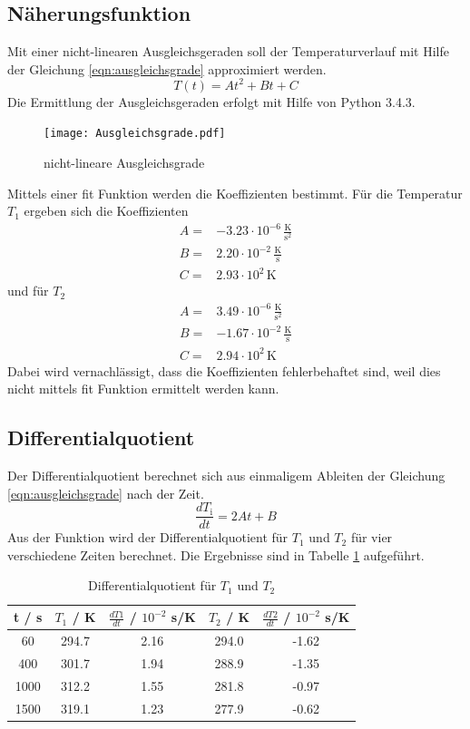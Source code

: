 \subsection{Näherungsfunktion}
Mit einer nicht-linearen Ausgleichsgeraden soll der Temperaturverlauf mit Hilfe der Gleichung \ref{eqn:ausgleichsgrade} approximiert werden.
\begin{equation}
  T(t) = At^2 + Bt +C
  \label{eqn:ausgleichsgrade}
\end{equation}
Die Ermittlung der Ausgleichsgeraden erfolgt mit Hilfe von Python 3.4.3.
\begin{figure}
  \centering
  \texttt{[image: Ausgleichsgrade.pdf]}
  \caption{nicht-lineare Ausgleichsgrade}
  \label{fig:ausg}
\end{figure}
Mittels einer fit Funktion werden die Koeffizienten bestimmt. Für die Temperatur $T_\text{1}$ ergeben sich die Koeffizienten
\begin{eqnarray*}
  A =& -3.23 \cdot 10^{-6} \, \frac{\text{K}}{\text{s}^2}	\\
  B =& 2.20 \cdot 10^{-2} \, \frac{\text{K}}{\text{s}} 	\\
  C =& 2.93 \cdot 10^{2} \, \text{K} 
  \label{eqn:koefT1}
\end{eqnarray*}
und für $T_\text{2}$
\begin{eqnarray*}
  A =& 3.49 \cdot 10^{-6} \, \frac{\text{K}}{\text{s}^2} 	\\
  B =& -1.67 \cdot 10^{-2} \, \frac{\text{K}}{\text{s}} 	\\
  C =& 2.94 \cdot 10^2 \, \text{K}
  \label{eqn:koefT2}
\end{eqnarray*}
Dabei wird vernachlässigt, dass die Koeffizienten fehlerbehaftet sind, weil dies nicht mittels fit Funktion ermittelt werden kann.
\subsection{Differentialquotient}
Der Differentialquotient berechnet sich aus einmaligem Ableiten der Gleichung \ref{eqn:ausgleichsgrade} nach der Zeit.
\begin{equation}
  \frac{dT_\text{i}}{dt} = 2At + B
  \label{eqn:diffq}
\end{equation}
Aus der Funktion wird der Differentialquotient für $T_\text{1}$ und $T_\text{2}$ für vier verschiedene Zeiten berechnet. Die Ergebnisse sind in Tabelle \ref{tab:diffQ} aufgeführt.
\begin{table}
  \centering
  \begin{tabular}{c c c c c}
  	\toprule
	t / s & $T_\text{1}$ / K & $\frac{dT1}{dt}$ / $10^{-2}$ s/K & $T_\text{2}$ / K & $\frac{dT2}{dt}$ / $10^{-2}$ s/K \\
	\midrule
	60	  & 294.7   & 2.16 & 294.0 & -1.62 \\
	400	  & 301.7   & 1.94 & 288.9 & -1.35 \\
	1000	& 312.2   & 1.55 & 281.8 & -0.97 \\
	1500	& 319.1   & 1.23 & 277.9 & -0.62 \\
	\bottomrule
  \end{tabular}
  \caption{Differentialquotient für $T_\text{1}$ und $T_\text{2}$}
  \label{tab:diffQ}
\end{table}

